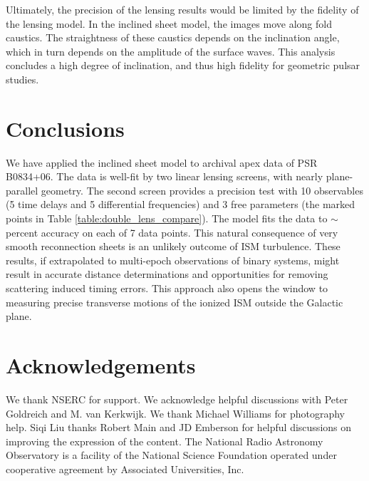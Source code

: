 \documentclass[useAMS,usenatbib]{mn2e}
\begin{document}
Ultimately, the precision of the lensing results would be limited by
the fidelity of the lensing model.  In the inclined sheet model, the
images move along fold caustics.  The straightness of these caustics
depends on the inclination angle, which in turn depends on the
amplitude of the surface waves.  This analysis concludes a high degree
of inclination, and thus high fidelity for geometric pulsar studies.

\section{Conclusions}
\label{sec:conclusions}
We have applied the inclined sheet model \citep{2014MNRAS.442.3338P} 
to archival apex data of PSR B0834+06.  The data is well-fit by two
linear lensing screens, with nearly plane-parallel geometry.  The
second screen provides a precision test with 10 observables (5 time delays and 5 differential frequencies) and 3 free
parameters (the marked points in Table \ref{table:double_lens_compare}).  The model fits the data to $\sim$ percent accuracy
on each of 7 data points.  
This natural consequence of very smooth
reconnection sheets is an unlikely outcome of ISM turbulence.  These
results, if extrapolated to multi-epoch observations of binary
systems, might result in accurate distance determinations and
opportunities for removing scattering induced timing errors.  This
approach also opens the window to measuring precise transverse motions
of the ionized ISM outside the Galactic plane.


\section{Acknowledgements}

We thank NSERC for support. We acknowledge helpful discussions with
Peter Goldreich and M. van Kerkwijk.  
We thank Michael Williams for photography help.  
Siqi Liu thanks Robert Main and JD Emberson for helpful discussions on
improving the expression of the content.  
The National Radio Astronomy Observatory is a facility of the National Science Foundation operated under cooperative agreement by Associated Universities, Inc.
\end{document}
